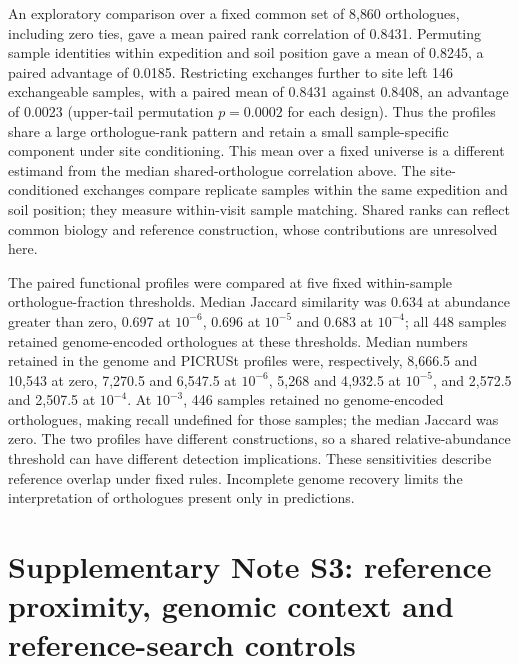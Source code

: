 \documentclass[11pt]{article}
\begin{document}
An exploratory comparison over a fixed common set of 8{,}860 orthologues, including zero ties, gave a mean paired rank correlation of 0.8431. Permuting sample identities within expedition and soil position gave a mean of 0.8245, a paired advantage of 0.0185. Restricting exchanges further to site left 146 exchangeable samples, with a paired mean of 0.8431 against 0.8408, an advantage of 0.0023 (upper-tail permutation $p = 0.0002$ for each design). Thus the profiles share a large orthologue-rank pattern and retain a small sample-specific component under site conditioning. This mean over a fixed universe is a different estimand from the median shared-orthologue correlation above. The site-conditioned exchanges compare replicate samples within the same expedition and soil position; they measure within-visit sample matching. Shared ranks can reflect common biology and reference construction, whose contributions are unresolved here.

The paired functional profiles were compared at five fixed within-sample orthologue-fraction thresholds. Median Jaccard similarity was 0.634 at abundance greater than zero, 0.697 at $10^{-6}$, 0.696 at $10^{-5}$ and 0.683 at $10^{-4}$; all 448 samples retained genome-encoded orthologues at these thresholds. Median numbers retained in the genome and PICRUSt profiles were, respectively, 8{,}666.5 and 10{,}543 at zero, 7{,}270.5 and 6{,}547.5 at $10^{-6}$, 5{,}268 and 4{,}932.5 at $10^{-5}$, and 2{,}572.5 and 2{,}507.5 at $10^{-4}$. At $10^{-3}$, 446 samples retained no genome-encoded orthologues, making recall undefined for those samples; the median Jaccard was zero. The two profiles have different constructions, so a shared relative-abundance threshold can have different detection implications. These sensitivities describe reference overlap under fixed rules. Incomplete genome recovery limits the interpretation of orthologues present only in predictions.

\section*{Supplementary Note S3: reference proximity, genomic context and reference-search controls}
\end{document}
